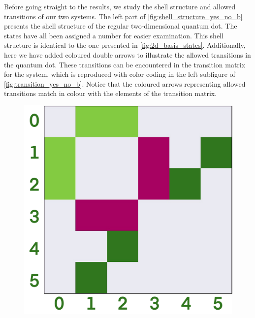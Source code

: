 Before going straight to the results, we study the shell structure and allowed transitions of 
our two systems. The left part of \autoref{fig:shell_structure_yes_no_b} presents the 
shell structure of the regular two-dimensional quantum dot. The states have all been assigned
a number for easier examination. This shell structure is 
identical to the one presented in \autoref{fig:2d_basis_states}. Additionally, here we have added
coloured double arrows to illustrate the allowed transitions in the quantum dot. These 
transitions can be encountered in the transition matrix for the system, which is
reproduced with color coding in the left subfigure of
\autoref{fig:transition_yes_no_b}. Notice that the coloured 
arrows representing allowed transitions match in colour with the elements of the transition 
matrix.

\begin{figure}
    \begin{center}
    \begin{minipage}{0.45\textwidth}
        \centering
        \includegraphics[width=\textwidth]{results/figures/dipole_no_b.png}
    \end{minipage}\hfill
    \begin{minipage}{0.45\textwidth}

\end{minipage}
\end{center}
\end{figure}
